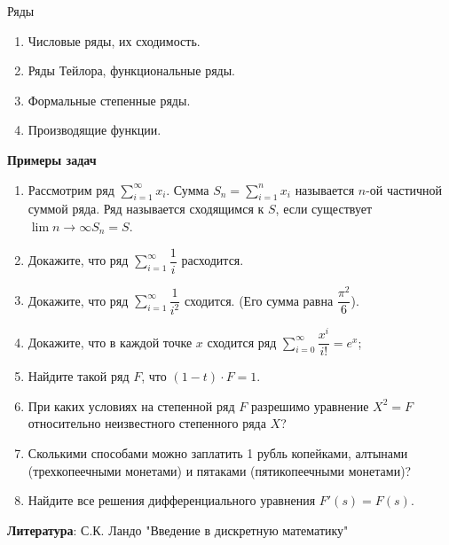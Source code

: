 \documentclass[a4paper,12pt]{article}
\begin{document}

\begin{center}
Ряды
\end{center}

\begin{enumerate}
\item Числовые ряды, их сходимость.
\item Ряды Тейлора, функциональные ряды.
\item Формальные степенные ряды.
\item Производящие функции.
\end{enumerate}

{\bf Примеры задач}

\begin{enumerate}
\item Рассмотрим ряд $\sum\limits_{i=1}^{\infty} x_i$. Сумма $S_n=\sum\limits_{i=1}^{n} x_i$ называется $n$-ой частичной суммой ряда. Ряд называется сходящимся к $S$, если существует $\lim\limits{n\to\infty} S_n = S$.
\item Докажите, что ряд $\sum\limits_{i=1}^{\infty} \dfrac{1}{i}$ расходится.\\
\item Докажите, что ряд $\sum\limits_{i=1}^{\infty}\dfrac{1}{i^2}$ сходится. (Его сумма равна $\dfrac{\pi^2}{6}$).
\item Докажите, что в каждой точке $x$ сходится ряд $\sum\limits_{i=0}^{\infty} \dfrac{x^i}{i!} = e^x$;
\item Найдите такой ряд $F$, что $(1-t)\cdot F = 1$.
\item При каких условиях на степенной ряд $F$ разрешимо уравнение $X^2 = F$ относительно неизвестного степенного ряда $X$?
\item Сколькими способами можно заплатить 1 рубль копейками, алтынами (трехкопеечными монетами) и пятаками (пятикопеечными монетами)?
\item Найдите все решения дифференциального уравнения $F'(s)=F(s)$.

\end{enumerate}

{\bf Литература}: С.К. Ландо "Введение в дискретную математику"
\end{document}
